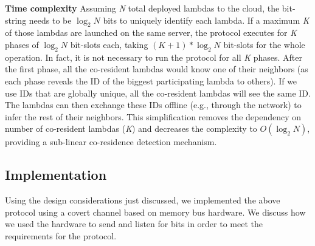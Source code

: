 \textbf{Time complexity}
\label{sec:protocol:complexity}
Assuming \textit{N} total deployed lambdas to the cloud, the bit-string needs
to be $\log_2N$ bits to uniquely identify each lambda. If a maximum \textit{K}
of those lambdas are launched on the same server, the protocol executes for
\textit{K} phases of $\log_2N$ bit-slots each, taking $(K+1)*\log_2N$ bit-slots
for the whole operation.  In fact, it is not necessary to run the protocol for all \textit{K}
phases. After the first phase, all the co-resident lambdas would know one of
their neighbors (as each phase reveals the ID of the biggest participating
lambda to others).  If we use IDs that are globally unique, all the
co-resident lambdas will see the same ID. The lambdas can then exchange these IDs
offline (e.g., through the network) to infer the rest of their neighbors. This
simplification removes the dependency on number of co-resident lambdas
(\textit{K}) and decreases the complexity to $O(\log_2N)$, providing a
sub-linear co-residence detection mechanism.


\subsection{Implementation}
\label{sec:method:impl}
Using the design considerations just discussed, we implemented the above
protocol using a covert channel based on memory bus hardware.  We discuss how we
used the hardware to send and listen for bits in order to meet the requirements
for the protocol. 

